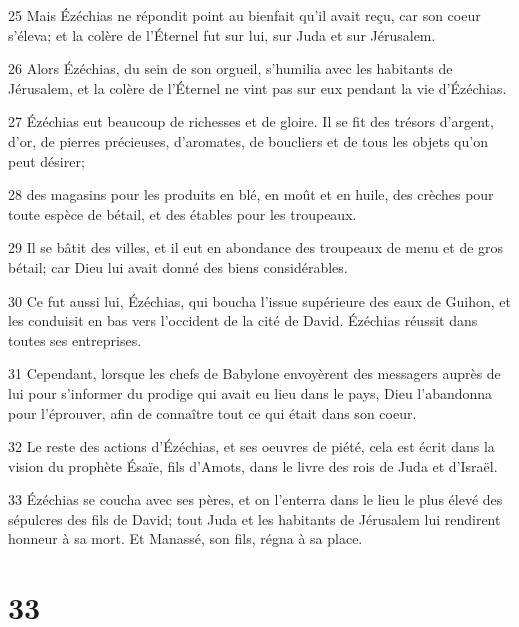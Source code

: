 \par 25 Mais Ézéchias ne répondit point au bienfait qu'il avait reçu, car son coeur s'éleva; et la colère de l'Éternel fut sur lui, sur Juda et sur Jérusalem.
\par 26 Alors Ézéchias, du sein de son orgueil, s'humilia avec les habitants de Jérusalem, et la colère de l'Éternel ne vint pas sur eux pendant la vie d'Ézéchias.
\par 27 Ézéchias eut beaucoup de richesses et de gloire. Il se fit des trésors d'argent, d'or, de pierres précieuses, d'aromates, de boucliers et de tous les objets qu'on peut désirer;
\par 28 des magasins pour les produits en blé, en moût et en huile, des crèches pour toute espèce de bétail, et des étables pour les troupeaux.
\par 29 Il se bâtit des villes, et il eut en abondance des troupeaux de menu et de gros bétail; car Dieu lui avait donné des biens considérables.
\par 30 Ce fut aussi lui, Ézéchias, qui boucha l'issue supérieure des eaux de Guihon, et les conduisit en bas vers l'occident de la cité de David. Ézéchias réussit dans toutes ses entreprises.
\par 31 Cependant, lorsque les chefs de Babylone envoyèrent des messagers auprès de lui pour s'informer du prodige qui avait eu lieu dans le pays, Dieu l'abandonna pour l'éprouver, afin de connaître tout ce qui était dans son coeur.
\par 32 Le reste des actions d'Ézéchias, et ses oeuvres de piété, cela est écrit dans la vision du prophète Ésaïe, fils d'Amots, dans le livre des rois de Juda et d'Israël.
\par 33 Ézéchias se coucha avec ses pères, et on l'enterra dans le lieu le plus élevé des sépulcres des fils de David; tout Juda et les habitants de Jérusalem lui rendirent honneur à sa mort. Et Manassé, son fils, régna à sa place.

\chapter{33}

